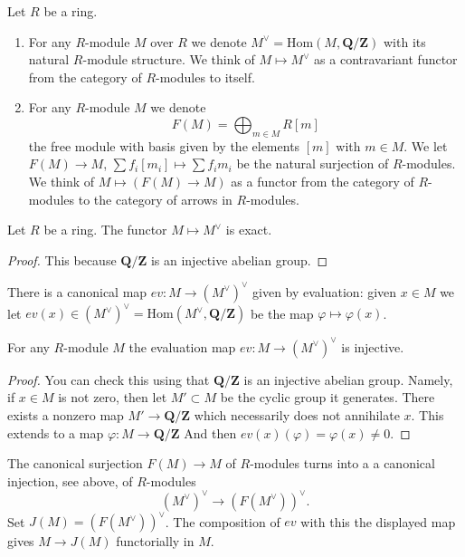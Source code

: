 \begin{definition}
\label{definition-simple-functors}
Let $R$ be a ring.
\begin{enumerate}
\item For any $R$-module $M$ over $R$ we denote 
$M^\vee = \text{Hom}(M,\mathbf{Q}/\mathbf{Z})$
with its natural $R$-module structure. We think
of $M \mapsto M^\vee$ as a contravariant functor
from the category of $R$-modules to itself.
\item For any $R$-module $M$ we denote
$$
F(M) = \bigoplus\nolimits_{m \in M} R[m]
$$
the free module with basis given by the elements $[m]$ with
$m \in M$. We let $F(M)\to M$, $\sum f_i [m_i] \mapsto \sum f_i m_i$
be the natural surjection of $R$-modules.
We think of $M \mapsto (F(M) \to M)$ as a functor from
the category of $R$-modules to the category of
arrows in $R$-modules.
\end{enumerate}
\end{definition}

\begin{lemma}
\label{lemma-vee-exact}
Let $R$ be a ring.
The functor $M \mapsto M^\vee$ is exact.
\end{lemma}

\begin{proof}
This because $\mathbf{Q}/\mathbf{Z}$
is an injective abelian group.
\end{proof}

\noindent
There is a canonical map $ev : M \to (M^\vee)^\vee$
given by evaluation: given $x \in M$ we let
$ev(x) \in (M^\vee)^\vee = \text{Hom}(M^\vee, \mathbf{Q}/\mathbf{Z})$
be the map $\varphi \mapsto \varphi(x)$.

\begin{lemma}
\label{lemma-ev-injective}
For any $R$-module $M$ the evaluation map
$ev : M \to (M^\vee)^\vee$ is injective.
\end{lemma}

\begin{proof}
You can check this using that $\mathbf{Q}/\mathbf{Z}$ is an injective
abelian group. Namely, if $x \in M$ is not zero, then let
$M' \subset M$ be the cyclic group it generates. There exists
a nonzero map $M' \to \mathbf{Q}/\mathbf{Z}$ which necessarily does
not annihilate $x$. This extends to
a map $\varphi : M \to \mathbf{Q}/\mathbf{Z}$
And then $ev(x)(\varphi) = \varphi(x) \not = 0$.
\end{proof}

\noindent
The canonical surjection $F(M) \to M$ of $R$-modules turns into a
a canonical injection, see above, of $R$-modules 
$$
(M^\vee)^\vee \longrightarrow (F(M^\vee))^\vee.
$$
Set $J(M) = (F(M^\vee))^\vee$. The composition of $ev$ with this
the displayed map gives $M \to J(M)$ functorially in $M$.

